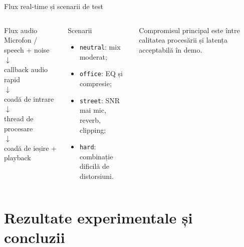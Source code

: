 \documentclass[aspectratio=169,11pt]{beamer}
\begin{document}
\begin{frame}{Flux real-time și scenarii de test}
  \begin{columns}[T,onlytextwidth]
      \begin{block}{Flux audio}
        \centering
        Microfon / speech + noise\\
        $\downarrow$\\
        callback audio rapid\\
        $\downarrow$\\
        coadă de intrare\\
        $\downarrow$\\
        thread de procesare\\
        $\downarrow$\\
        coadă de ieșire + playback
      \end{block}

      \begin{block}{Scenarii}
        \begin{itemize}
          \item \texttt{neutral}: mix moderat;
          \item \texttt{office}: EQ și compresie;
          \item \texttt{street}: SNR mai mic, reverb, clipping;
          \item \texttt{hard}: combinație dificilă de distorsiuni.
        \end{itemize}
      \end{block}
      \small
      Compromisul principal este între calitatea procesării și latența acceptabilă în demo.
  \end{columns}
\end{frame}

\section{Rezultate experimentale și concluzii}
\end{document}
